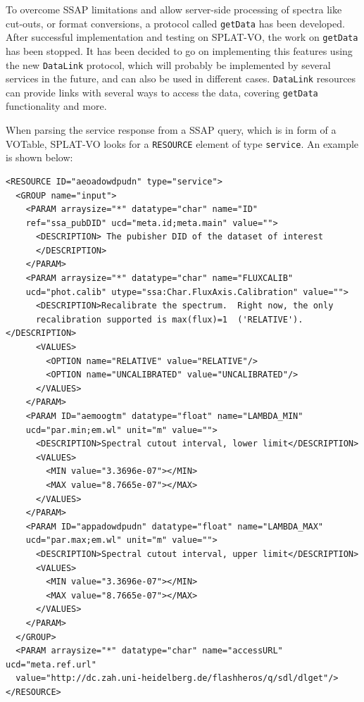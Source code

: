 \documentclass[final,authoryear,5p,times,twocolumn]{elsarticle}
\begin{document}
To overcome SSAP limitations and allow server-side processing of
spectra like cut-outs, or format conversions, a protocol called
\texttt{getData} \citep{getData}  has been developed. After successful implementation and
testing on SPLAT-VO, the work on \texttt{getData} has been stopped. It has been
decided to go on implementing this features using the new \texttt{DataLink}
protocol, which will probably be implemented by several services in
the future, and can also be used in different cases.  \texttt{DataLink}
resources can provide links with several ways to access the data,
covering \texttt{getData} functionality and more. 

When parsing the service response from a SSAP query, which is in form
of a VOTable, SPLAT-VO looks for a \texttt{RESOURCE} element of type \texttt{service}.
An example is shown below:

{\tiny
\begin{minipage}{\textwidth}
\begin{verbatim}
<RESOURCE ID="aeoadowdpudn" type="service">
  <GROUP name="input">
    <PARAM arraysize="*" datatype="char" name="ID"
    ref="ssa_pubDID" ucd="meta.id;meta.main" value="">
      <DESCRIPTION> The pubisher DID of the dataset of interest
      </DESCRIPTION>
    </PARAM>
    <PARAM arraysize="*" datatype="char" name="FLUXCALIB"
    ucd="phot.calib" utype="ssa:Char.FluxAxis.Calibration" value="">
      <DESCRIPTION>Recalibrate the spectrum.  Right now, the only
      recalibration supported is max(flux)=1  ('RELATIVE').</DESCRIPTION>
      <VALUES>
        <OPTION name="RELATIVE" value="RELATIVE"/>
        <OPTION name="UNCALIBRATED" value="UNCALIBRATED"/>
      </VALUES>
    </PARAM>
    <PARAM ID="aemoogtm" datatype="float" name="LAMBDA_MIN"
    ucd="par.min;em.wl" unit="m" value="">
      <DESCRIPTION>Spectral cutout interval, lower limit</DESCRIPTION>
      <VALUES>
        <MIN value="3.3696e-07"></MIN>
        <MAX value="8.7665e-07"></MAX>
      </VALUES>
    </PARAM>
    <PARAM ID="appadowdpudn" datatype="float" name="LAMBDA_MAX"
    ucd="par.max;em.wl" unit="m" value="">
      <DESCRIPTION>Spectral cutout interval, upper limit</DESCRIPTION>
      <VALUES>
        <MIN value="3.3696e-07"></MIN>
        <MAX value="8.7665e-07"></MAX>
      </VALUES>
    </PARAM>
  </GROUP>
  <PARAM arraysize="*" datatype="char" name="accessURL" ucd="meta.ref.url"
  value="http://dc.zah.uni-heidelberg.de/flashheros/q/sdl/dlget"/>
</RESOURCE>
\end{verbatim}

\end{minipage}
}
\end{document}
